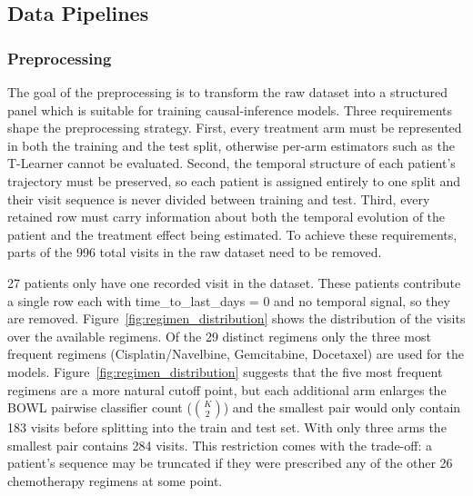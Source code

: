 \documentclass{article}
\begin{document}
\subsection{Data Pipelines}
\subsubsection{Preprocessing}
The goal of the preprocessing is to transform the raw dataset into a structured panel which is suitable for training causal-inference models. Three requirements
shape the preprocessing strategy. First, every treatment arm must be
represented in both the training and the test split, otherwise per-arm
estimators such as the T-Learner cannot be evaluated. Second, the
temporal structure of each patient's trajectory must be preserved, so
each patient is assigned entirely to one split and their visit sequence
is never divided between training and test.
Third, every retained row must carry information about both the temporal evolution of the patient and the treatment effect being estimated.
To achieve these requirements, parts of the 996 total visits in the raw dataset need to be removed.

27 patients only have one recorded visit in the dataset. These patients contribute a single row each with time\_to\_last\_days = 0 and no temporal signal, so they are removed.
Figure~\ref{fig:regimen_distribution} shows the distribution of the visits over the available regimens. Of the 29 distinct regimens only the three most frequent regimens (Cisplatin/Navelbine, Gemcitabine, Docetaxel) are used for the models. Figure~\ref{fig:regimen_distribution} suggests that the five most frequent regimens are a more natural cutoff point, but each additional arm enlarges the BOWL pairwise classifier
count ($\binom{K}{2}$) and the smallest pair would only contain 183 visits before splitting into the train and test set. With only three arms the smallest pair contains 284 visits.
This restriction comes with the trade-off: a patient's sequence may be truncated if they were prescribed any of the other 26 chemotherapy regimens at some point.
\end{document}
